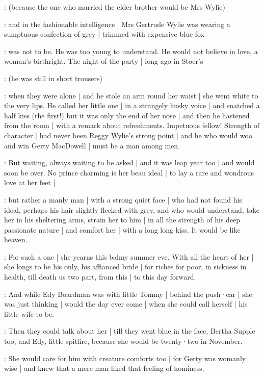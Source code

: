 \gertyReal:
(because the one who married the elder brother
would be Mrs Wylie)

\gertyNovel:
and in the fashionable intelligence |
Mrs Gertrude Wylie was wearing a sumptuous confection of grey |
trimmed with expensive blue fox

\gertyRomantic:
was not to be.
He was too young to understand.
He would not believe in love,
a woman's birthright.
The night of the party |
long ago in Stoer's

\gertyReal:
(he was still in short trousers)

\gertyRomantic:
when they were alone |
and he stole an arm round her waist |
she went white
to the very lips.
He called her little one |
in a strangely husky voice |
and snatched a half kiss
(the first!)
but it was only the end of her nose |
and then he hastened from the room |
with a remark about refreshments.
Impetuous fellow!
Strength of character |
had never been Reggy Wylie's strong point |
and he who would woo and win Gerty MacDowell |
must be a man among men.

\gertyNovel:
But waiting,
always waiting to be asked |
and it was leap year too |
and would soon be over.
No prince charming is her beau ideal |
to lay a rare and wondrous love at her feet |

\gertySex:
but rather a manly man |
with a strong quiet face |
who had not found his ideal,
perhaps his hair slightly flecked with grey,
and who would understand,
take her in his sheltering arms,
strain her to him |
in all the strength of his deep passionate nature |
and comfort her |
with a long long kiss.
It would be like heaven.

\gertyRomantic:
For such a one |
she yearns this balmy summer eve.
With all the heart of her |
she longs to be his only,
his affianced bride |
for riches
for poor,
in sickness
in health,
till death us two part,
from this |
to this day forward.

\gertyReal:
And while Edy Boardman was with little Tommy |
behind the push·car |
she was just thinking |
would the day ever come |
when she could call herself |
his little wife to be.%

\gertyJudgy:
Then they could talk about her |
till they went blue in the face,
Bertha Supple too,
and Edy,
little spitfire,
because she would be twenty·two in November.

\gertyRomantic:
She would care for him with creature comforts too |
for Gerty was womanly wise |
and knew that a mere man liked that feeling of hominess.

